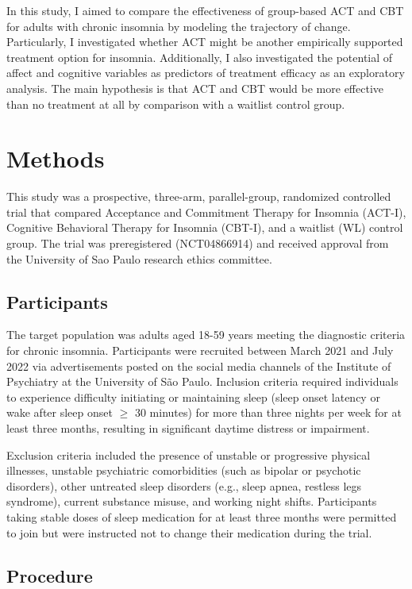 \documentclass[
  english,
  man]{apa6}
\begin{document}
In this study, I aimed to compare the effectiveness of group-based ACT and CBT for adults with chronic insomnia by modeling the trajectory of change. Particularly, I investigated whether ACT might be another empirically supported treatment option for insomnia. Additionally, I also investigated the potential of affect and cognitive variables as predictors of treatment efficacy as an exploratory analysis. The main hypothesis is that ACT and CBT would be more effective than no treatment at all by comparison with a waitlist control group.

\section{Methods}\label{methods}

This study was a prospective, three-arm, parallel-group, randomized controlled trial that compared Acceptance and Commitment Therapy for Insomnia (ACT-I), Cognitive Behavioral Therapy for Insomnia (CBT-I), and a waitlist (WL) control group. The trial was preregistered (NCT04866914) and received approval from the University of Sao Paulo research ethics committee.

\subsection{Participants}\label{participants}

The target population was adults aged 18-59 years meeting the diagnostic criteria for chronic insomnia. Participants were recruited between March 2021 and July 2022 via advertisements posted on the social media channels of the Institute of Psychiatry at the University of São Paulo. Inclusion criteria required individuals to experience difficulty initiating or maintaining sleep (sleep onset latency or wake after sleep onset \(\geq\) 30 minutes) for more than three nights per week for at least three months, resulting in significant daytime distress or impairment.

Exclusion criteria included the presence of unstable or progressive physical illnesses, unstable psychiatric comorbidities (such as bipolar or psychotic disorders), other untreated sleep disorders (e.g., sleep apnea, restless legs syndrome), current substance misuse, and working night shifts. Participants taking stable doses of sleep medication for at least three months were permitted to join but were instructed not to change their medication during the trial.

\subsection{Procedure}\label{procedure}
\end{document}
